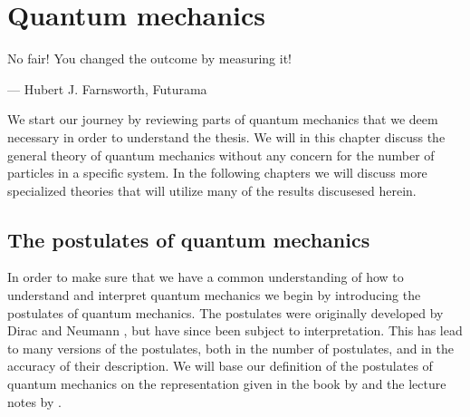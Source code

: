 \chapter{Quantum mechanics}
    \epigraph{No fair! You changed the outcome by measuring it!}
    {--- Hubert J. Farnsworth, Futurama}

    We start our journey by reviewing parts of quantum mechanics that we deem
    necessary in order to understand the thesis.
    We will in this chapter discuss the general theory of quantum mechanics
    without any concern for the number of particles in a specific system.
    In the following chapters we will discuss more specialized theories that
    will utilize many of the results discusesed herein.

    \section{The postulates of quantum mechanics}
        In order to make sure that we have a common understanding of how to
        understand and interpret quantum mechanics we begin by introducing the
        postulates of quantum mechanics.
        The postulates were originally developed by Dirac
        \cite{dirac1981principles} and Neumann \cite{von2018mathematical},
        but have since been subject to interpretation.
        This has lead to many versions of the postulates, both in the number of
        postulates, and in the accuracy of their description.
        We will base our definition of the postulates of quantum mechanics on
        the representation given in the book  by
        \citeauthor{salasnich2017quantum} \cite{salasnich2017quantum} and the
        lecture notes by \citeauthor{modern-qm} \cite{modern-qm}.


